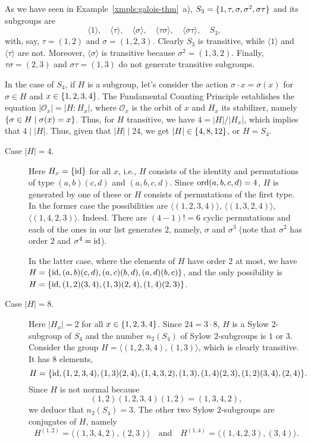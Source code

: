 \begin{solution}
    As we have seen in Example~\ref{xmpls:galois-thm}~a), $S_3=\{1,\tau,\sigma,\sigma^2,\sigma\tau\}$ and its subgroups are
    $$
        \langle 1 \rangle
                ,\quad \langle \tau \rangle
                ,\quad \langle \sigma \rangle
                ,\quad \langle \tau\sigma \rangle
                ,\quad \langle \sigma\tau \rangle
                ,\quad S_3,
    $$
    with, say, $\tau=(1,2)$ and $\sigma=(1,2,3)$. Clearly $S_3$ is transitive, while $\langle1\rangle$ and $\langle\tau\rangle$ are not. Moreover, $\langle\sigma\rangle$ is transitive because $\sigma^2=(1,3,2)$. Finally, $\tau\sigma=(2,3)$ and $\sigma\tau=(1,3)$ do not generate transitive subgroups.

    In the case of $S_4$, if $H$ is a subgroup, let's consider the action $\sigma\cdot x=\sigma(x)$ for $\sigma\in H$ and $x\in\{1,2,3,4\}$. The Fundamental Counting Principle \citep{LC} establishes the equation $|\mathcal O_x|=|H:H_x|$, where $\mathcal O_x$ is the orbit of $x$ and $H_x$ its stabilizer, namely $\{\sigma\in H\mid \sigma(x)=x\}$. Thus, for $H$ transitive, we have $4=|H|/|H_x|$, which implies that $4\mid |H|$. Thus, given that $|H|\mid24$, we get $|H|\in\{4, 8, 12\}$, or $H=S_4$.

    \begin{description}
        \item[Case $|H|=4$.] Here $H_x=\{\operatorname{id}\}$ for all $x$, i.e., $H$ consists of the identity and permutations of type $(a,b)(c,d)$ and $(a,b,c,d)$. Since ${\rm ord}(a,b,c,d)=4$, $H$ is generated by one of these or $H$ consists of permutations of the first type. In the former case the possibilities are $\langle(1,2,3,4)\rangle$, $\langle(1,3,2,4)\rangle$, $\langle(1,4,2,3)\rangle$. Indeed. There are $(4-1)!=6$ cyclic permutations and each of the ones in our list generates $2$, namely, $\sigma$ and $\sigma^3$ (note that $\sigma^2$ has order $2$ and $\sigma^4=\operatorname{id}$).
        
        In the latter case, where the elements of $H$ have order $2$ at most, we have $H=\{\operatorname{id}, (a,b)(c,d),(a,c)(b,d),(a,d)(b,c)\}$, and the only possibility is $H=\{\operatorname{id}, (1,2)(3,4),(1,3)(2,4),(1,4)(2,3)\}$.

        \item[Case $|H|=8$.] Here $|H_x|=2$ for all $x\in\{1,2,3,4\}$. Since $24=3\cdot 8$, $H$ is a Sylow $2$-subgroup of $S_4$ and the number $n_2(S_4)$ of Sylow $2$-subgroups is $1$ or $3$. Consider the group $H=\langle(1,2,3,4),(1,3)\rangle$, which is clearly transitive. It has $8$ elements,
        \small
        $$
            H=\{\operatorname{id},(1,2,3,4),(1,3)(2,4),(1,4,3,2),(1,3)
                ,(1,4)(2,3),(1,2)(3,4),(2,4)\}.
        $$
        \normalsize
        Since $H$ is not normal because
        \small
        $$
            (1,2)(1,2,3,4)(1,2) = (1,3,4,2),
        $$
        \normalsize
        we deduce that $n_2(S_4)=3$. The other two Sylow $2$-subgroups are conjugates of $H$, namely
        \small
        $$
            H^{(1,2)}=\langle(1,3,4,2),(2,3)\rangle\quad\text{and}\quad
            H^{(1,4)}=\langle(1,4,2,3),(3,4)\rangle.
        $$
        \normalsize
        

\end{description}
\end{solution}
